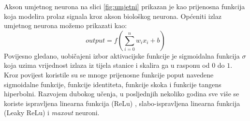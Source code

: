 \documentclass[times, utf8, diplomski]{fer}
\theoremstyle{definition}
\begin{document}
Akson umjetnog neurona na slici \ref{fig:umjetni} prikazan je kao prijenosna funkcija  koja modelira prolaz signala kroz akson biološkog neurona. Općeniti izlaz umjetnog neurona možemo prikazati kao:
\begin{equation}
output = f(\sum_{i=0}^{n}w_ix_i + b)
\end{equation}
Povijesno gledano, uobičajeni izbor aktivacijske funkcije je sigmoidalna funkcija $\sigma$ koja uzima vrijednost izlaza iz tijela stanice i skalira ga u rasponu od $0$ do $1$. Kroz povijest koristile su se mnoge prijenosne funkcije poput  navedene sigmoidalne funkcije, funkcije identiteta, funkcije skoka i funkcije tangens hiperbolni. Razvojem dubokog učenja, u posljednjih nekoliko godina sve više se koriste ispravljena linearna funkcija (ReLu) , slabo-ispravljena linearna funkcija (Leaky ReLu)  i \textit{maxout} neuroni.
\end{document}
